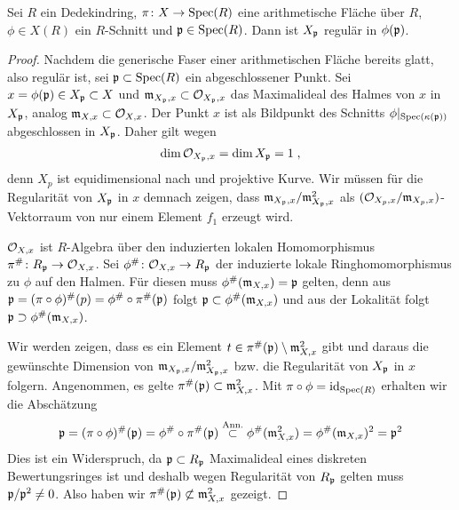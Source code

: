 \begin{Lemma}\label{thm:arithflschnittbilderglatt}
  Sei $R$ ein Dedekindring,
  $\pi\colon X\to\operatorname{Spec}(R)$ eine arithmetische Fläche über $R$,
  $\phi\in X(R)$ ein $R$-Schnitt und $\mathfrak{p}\in\operatorname{Spec}(R)$.
  Dann ist $X_{\mathfrak{p}}$ regulär in $\phi(\mathfrak{p})$.
  \begin{proof}
    Nachdem die generische Faser einer arithmetischen Fläche bereits
    glatt, also regulär ist, sei $\mathfrak{p}\subset\operatorname{Spec}(R)$ ein abgeschlossener
    Punkt.
    Sei $x=\phi(\mathfrak{p})\in X_{\mathfrak{p}}\subset X$ und $\mathfrak{m}_{X_{\mathfrak{p}},x}\subset\mathcal{O}_{X_{\mathfrak{p}},x}$
    das Maximalideal des Halmes von $x$ in $X_{\mathfrak{p}}$,
    analog $\mathfrak{m}_{X,x}\subset\mathcal{O}_{X,x}$.
    Der Punkt $x$ ist als Bildpunkt des Schnitts
    $\phi|_{\operatorname{Spec}(\kappa(\mathfrak{p}))}$ abgeschlossen in $X_{\mathfrak{p}}$.
    Daher gilt wegen \cite[Corollary 2.5.24]{liu}
    \begin{gather*}
      \dim\mathcal{O}_{X_{\mathfrak{p}},x}=\dim X_{\mathfrak{p}}=1\;,
    \end{gather*}
    denn $X_p$ ist equidimensional nach
    \cite[Proposition 4.4.16]{liu} und projektive Kurve.
    Wir müssen für die Regularität von $X_{\mathfrak{p}}$ in $x$ demnach zeigen,
    dass $\mathfrak{m}_{X_{\mathfrak{p}},x}/\mathfrak{m}_{X_{\mathfrak{p}},x}^2$ als $(\mathcal{O}_{X_p,x}/\mathfrak{m}_{X_p,x})$-Vektorraum
    von nur einem Element $f_1$ erzeugt wird.
    
    $\mathcal{O}_{X,x}$ ist $R$-Algebra über den induzierten lokalen
    Homomorphismus $\pi^\#\colon R_{\mathfrak{p}}\to\mathcal{O}_{X,x}$.
    Sei $\phi^\#\colon\mathcal{O}_{X,x}\to R_{\mathfrak{p}}$ der induzierte lokale
    Ringhomomorphismus zu $\phi$ auf den Halmen. Für diesen muss
    $\phi^\#(\mathfrak{m}_{X,x})=\mathfrak{p}$ gelten, denn aus
    $\mathfrak{p}=(\pi\circ\phi)^\#(p)=\phi^\#\circ\pi^\#(\mathfrak{p})$ folgt
    $\mathfrak{p}\subset\phi^\#(\mathfrak{m}_{X,x})$ und aus der Lokalität folgt
    $\mathfrak{p}\supset\phi^\#(\mathfrak{m}_{X,x})$.
    
    Wir werden zeigen, dass es ein Element
    $t\in\pi^\#(\mathfrak{p})\setminus\mathfrak{m}_{X,x}^2$ gibt und
    daraus die gewünschte Dimension von $\mathfrak{m}_{X_{\mathfrak{p}},x}/\mathfrak{m}_{X_{\mathfrak{p}},x}^2$
    bzw. die Regularität von $X_{\mathfrak{p}}$ in $x$ folgern.
    Angenommen, es gelte $\pi^\#(\mathfrak{p})\subset\mathfrak{m}_{X,x}^2$.
    Mit $\pi\circ\phi=\mathrm{id}_{\operatorname{Spec}(R)}$ erhalten wir die Abschätzung
    \begin{gather*}
      \mathfrak{p} = (\pi\circ\phi)^\#(\mathfrak{p})
      = \phi^\#\circ\pi^\#(\mathfrak{p})
      \overset{\text{Ann.}}{\subset} \phi^\#(\mathfrak{m}_{X,x}^2)
      = \phi^\#(\mathfrak{m}_{X,x})^2
      = \mathfrak{p}^2
    \end{gather*}
    Dies ist ein Widerspruch, da $\mathfrak{p}\subset R_{\mathfrak{p}}$ Maximalideal eines
    diskreten Bewertungsringes ist und deshalb wegen Regularität von
    $R_{\mathfrak{p}}$ gelten muss $\mathfrak{p}/\mathfrak{p}^2\neq 0$.
    Also haben wir $\pi^\#(\mathfrak{p})\not\subset\mathfrak{m}_{X,x}^2$ gezeigt.


\end{proof}
\end{Lemma}
